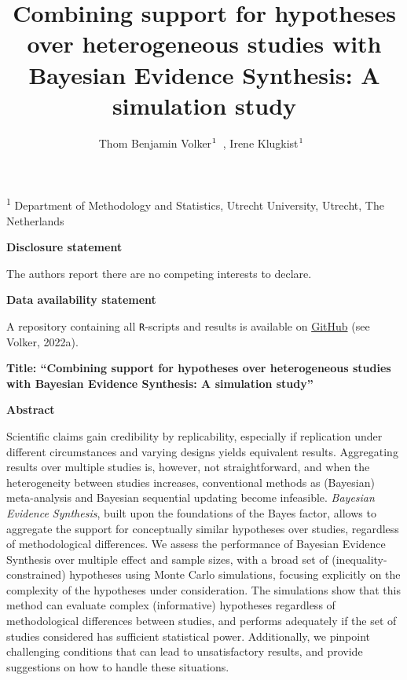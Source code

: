 \documentclass[
]{interact}
\title{Combining support for hypotheses over heterogeneous studies with
Bayesian Evidence Synthesis: A simulation study}
\author{Thom Benjamin
Volker$\textsuperscript{1}$~\orcidlink{0000-0002-2408-7820}, Irene
Klugkist$\textsuperscript{1}$~\orcidlink{0000-0001-9561-3691}}
\begin{document}
\maketitle
\textsuperscript{1} Department of Methodology and Statistics, Utrecht
University, Utrecht, The Netherlands
\ifdefined\Shaded\renewenvironment{Shaded}{\begin{tcolorbox}[borderline west={3pt}{0pt}{shadecolor}, breakable, sharp corners, boxrule=0pt, enhanced, interior hidden, frame hidden]}{\end{tcolorbox}}\fi

\doublespacing
{}

\textbf{Disclosure statement}

The authors report there are no competing interests to declare.

\textbf{Data availability statement}

A repository containing all \texttt{R}-scripts and results is available
on
\href{https://www.github.com/thomvolker/Master_Thesis/tree/master/MSBBSS/simulations}{GitHub}
(see Volker, 2022a).

\newpage

\textbf{Title: ``Combining support for hypotheses over heterogeneous
studies with Bayesian Evidence Synthesis: A simulation study''}

\textbf{Abstract}

Scientific claims gain credibility by replicability, especially if
replication under different circumstances and varying designs yields
equivalent results. Aggregating results over multiple studies is,
however, not straightforward, and when the heterogeneity between studies
increases, conventional methods as (Bayesian) meta-analysis and Bayesian
sequential updating become infeasible. \emph{Bayesian Evidence
Synthesis}, built upon the foundations of the Bayes factor, allows to
aggregate the support for conceptually similar hypotheses over studies,
regardless of methodological differences. We assess the performance of
Bayesian Evidence Synthesis over multiple effect and sample sizes, with
a broad set of (inequality-constrained) hypotheses using Monte Carlo
simulations, focusing explicitly on the complexity of the hypotheses
under consideration. The simulations show that this method can evaluate
complex (informative) hypotheses regardless of methodological
differences between studies, and performs adequately if the set of
studies considered has sufficient statistical power. Additionally, we
pinpoint challenging conditions that can lead to unsatisfactory results,
and provide suggestions on how to handle these situations.
\end{document}
